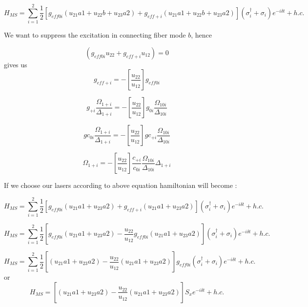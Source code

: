 \documentclass{article}
\begin{document}
\begin{equation}
     H_{MS} =  \sum_{i=1}^{2} \frac{1}{2} [g_{eff0i} (u_{21} a1 + u_{22} b + u_{23} a2) + g_{eff+i} (u_{21} a1 + u_{22} b + u_{23} a2) ](\sigma^{\dagger}_i+\sigma_i)  e^{-i \delta t} + h.c.
\end{equation}



We want to suppress the excitation in connecting fiber mode $b$, hence

\begin{equation}
  (g_{eff0i} u_{22}  + g_{eff+i} u_{12} ) = 0
\end{equation}
gives us
\begin{equation}
    g_{eff+i} = -\left[\frac{u_{22}}{u_{12}}\right] g_{eff0i} 
\end{equation}

\begin{equation}
    g_{+i} \frac{\Omega_{1+i}}{\Delta_{1+i}} = -\left[\frac{u_{22}}{u_{12}}\right] g_{0i} \frac{\Omega_{10i}}{\Delta_{10i}} 
\end{equation}

\begin{equation}
    g c_{0i} \frac{\Omega_{1+i}}{\Delta_{1+i}} = -\left[\frac{u_{22}}{u_{12}}\right] g c_{+i} \frac{\Omega_{10i}}{\Delta_{10i}} 
\end{equation}

\begin{equation}
     \Omega_{1+i} = -\left[\frac{u_{22}}{u_{12}}\right] \frac{c_{+i}}{c_{0i}} \frac{\Omega_{10i}}{\Delta_{10i}}{\Delta_{1+i}} 
\end{equation}

If we choose our lasers according to above equation hamiltonian will become : 

\begin{equation}
     H_{MS} =  \sum_{i=1}^{2} \frac{1}{2} [g_{eff0i} (u_{21} a1 + u_{23} a2) + g_{eff+i} (u_{21} a1 + u_{23} a2) ](\sigma^{\dagger}_i+\sigma_i)  e^{-i \delta t} + h.c.
\end{equation}

\begin{equation}
     H_{MS} =  \sum_{i=1}^{2} \frac{1}{2} [g_{eff0i} (u_{21} a1 + u_{23} a2) - \frac{u_{22}}{u_{12}} g_{eff0i} (u_{21} a1 + u_{23} a2) ](\sigma^{\dagger}_i+\sigma_i)  e^{-i \delta t} + h.c.
\end{equation}

\begin{equation}
     H_{MS} =  \sum_{i=1}^{2} \frac{1}{2} [(u_{21} a1 + u_{23} a2) - \frac{u_{22}}{u_{12}} (u_{21} a1 + u_{23} a2) ]g_{eff0i} (\sigma^{\dagger}_i+\sigma_i)  e^{-i \delta t} + h.c.
\end{equation} 
 or 
\begin{equation}
     H_{MS} = [(u_{21} a1 + u_{23} a2) - \frac{u_{22}}{u_{12}} (u_{21} a1 + u_{23} a2) ]  S_x e^{-i \delta t} + h.c.
\end{equation} 
\end{document}
